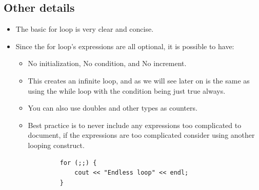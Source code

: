 \subsection{Other details}
\begin{itemize}
    \item The basic for loop is very clear and concise.
    \item Since the for loop's expressions are all optional, it is possible to have:
        \begin{itemize}
            \item No initialization, No condition, and No increment.
            \item This creates an infinite loop, and as we will see later on is the same as using the while loop with the condition being just true always.
            \item You can also use doubles and other types as counters.
            \item Best practice is to never include any expressions too complicated to document, if the expressions are too complicated consider using another looping construct.
        \end{itemize}
        \begin{verbatim}
            for (;;) {
                cout << "Endless loop" << endl;
            }
        \end{verbatim}
\end{itemize}

